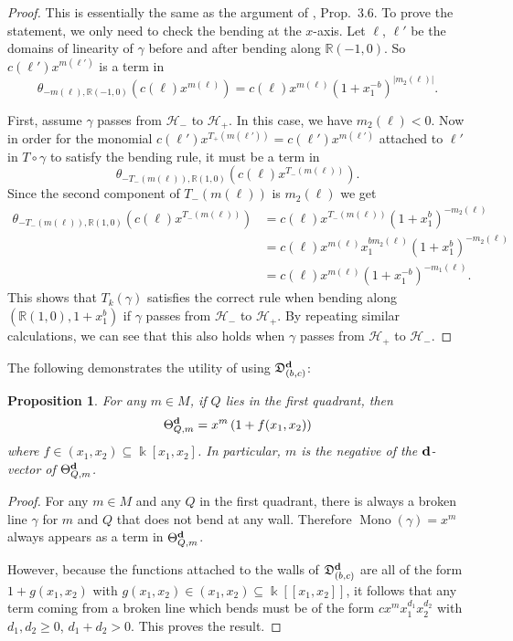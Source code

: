 \documentclass[10pt]{amsart}
\newtheorem{prop}[theorem]{Proposition}
\theoremstyle{remark}
\numberwithin{equation}{section}
\newcommand{\RR}{\mathbb{R}}
\newcommand{\fD}{\mathfrak{D}}
\newcommand{\bfd}{{\bf d}}
\newcommand{\Mono}{\operatorname{Mono}}
\begin{document}
\begin{proof}
  This is essentially the same as the argument of \cite{GHKK}, Prop.\ 3.6.  To
  prove the statement, we only need to check the bending at the $x$-axis. Let
  $\ell$, $\ell'$ be the domains of linearity of $\gamma$ before and after bending
  along $\RR (-1,0)$. So $c(\ell') x^{m(\ell')}$ is a term in 
  \[
    \theta_{-m(\ell),\RR(-1,0)} \left(c(\ell) x^{m(\ell)}\right)
    = 
    c(\ell) x^{m(\ell)} \left(1+x_1^{-b}\right) ^{|m_2(\ell)|}.
  \]

  First, assume $\gamma$ passes from $\mathcal{H}_-$ to $\mathcal{H}_+$. In this
  case, we have $m_2(\ell) < 0$. Now in order for the monomial
  $c(\ell')x^{T_+(m(\ell'))} =c(\ell')x^{m(\ell')}$ attached to $\ell'$ in
  $T\circ\gamma$ to satisfy the bending rule, it must be a term in
  \[
    \theta_{-T_-(m(\ell)),\RR (1,0)} \left(c(\ell) x^{T_-(m(\ell))}\right). 
  \]
  Since the second component of $T_-(m(\ell))$ is $m_2(\ell)$ we get
  \begin{align*} 
    \theta_{-T_-(m(\ell)),\RR (1,0)} \left(c(\ell) x^{T_-(m(\ell))}\right) 
    & =
    c(\ell) x^{T_-(m(\ell))} \left(1+x_1^b\right) ^{-m_2(\ell)}
    \\
    & = 
    c(\ell) x^{m(\ell)} x_1^{b m_2(\ell)} 
    \left(1+x_1^b\right)^{-m_2(\ell)} 
    \\
    & = 
    c(\ell) x^{m(\ell)} \left(1+x_1^{-b}\right) ^{-m_1(\ell)}.
  \end{align*}
  This shows that $T_k(\gamma)$ satisfies the correct rule when bending along
  $(\RR (1,0), 1+x_1^b)$ if $\gamma$ passes from $\mathcal{H}_-$ to
  $\mathcal{H}_+$. By repeating similar calculations, we can see that this also
  holds when $\gamma$ passes from $\mathcal{H}_+$ to $\mathcal{H}_-$.
\end{proof}

The following demonstrates the utility of using $\fD_{(b,c)}^\bfd$:

\begin{prop}
  For any  $m\in M$, if $Q$ lies in the first quadrant, then 
  \[
    \Theta^\bfd_{Q, m}=x^{m}\left(1+f(x_1,x_2)\right)
  \]
  where $f\in (x_1,x_2)\subseteq \Bbbk[x_1,x_2]$.
  In particular, $m$ is the negative of the $\bfd$-vector of
  $\Theta^\bfd_{Q,m}$.
\end{prop}

\begin{proof}
  For any $m\in M$ and any $Q$ in the first quadrant, there is always a broken
  line $\gamma$ for $m$ and $Q$ that does not bend at any wall. Therefore $\Mono
  (\gamma) = x^{m}$ always appears as a term in $\Theta^\bfd_{Q,m}$.

  However, because the functions attached to the walls of
  $\fD_{(b,c)}^\bfd$ are all of the form $1+g(x_1,x_2)$ with $g(x_1,x_2) \in
  (x_1,x_2) \subseteq \Bbbk[[x_1,x_2]]$, it follows that any term coming from a
  broken line which bends must be of the form $cx^{m}x_1^{d_1}x_2^{d_2}$ with
  $d_1,d_2\ge 0$, $d_1+d_2>0$. This proves the result.
\end{proof}
\end{document}
